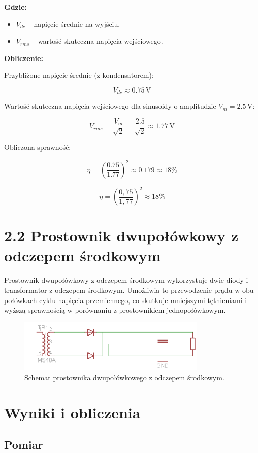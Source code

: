 \documentclass[a4paper,12pt]{article}
\begin{document}
\textbf{Gdzie:}

\begin{itemize}
    \item $V_{dc}$ – napięcie średnie na wyjściu,
    \item $V_{rms}$ – wartość skuteczna napięcia wejściowego.
\end{itemize}

\textbf{Obliczenie:}

Przybliżone napięcie średnie (z kondensatorem):

\[
V_{dc} \approx 0.75\,\text{V}
\]

Wartość skuteczna napięcia wejściowego dla sinusoidy o amplitudzie $V_m = 2.5\,\text{V}$:

\[
V_{rms} = \frac{V_m}{\sqrt{2}} = \frac{2.5}{\sqrt{2}} \approx 1.77\,\text{V}
\]

Obliczona sprawność:

\[
\eta = \left( \frac{0.75}{1.77} \right)^2 \approx 0.179 \approx 18\%
\]

\[
\eta = \left(\frac{0{,}75}{1{,}77}\right)^2 \approx 18\%
\]
\section*{2.2 Prostownik dwupołówkowy z odczepem środkowym}

Prostownik dwupołówkowy z odczepem środkowym wykorzystuje dwie diody i transformator z odczepem środkowym. Umożliwia to przewodzenie prądu w obu połówkach cyklu napięcia przemiennego, co skutkuje mniejszymi tętnieniami i wyższą sprawnością w porównaniu z prostownikiem jednopołówkowym.

\begin{figure}[H]
    \centering
    \includegraphics[width=0.8\textwidth]{5.png}
    \caption{Schemat prostownika dwupołówkowego z odczepem środkowym.}
    \label{fig:schemat_dwu}
\end{figure}

\section*{Wyniki i obliczenia}

\subsection*{Pomiar}
\end{document}
